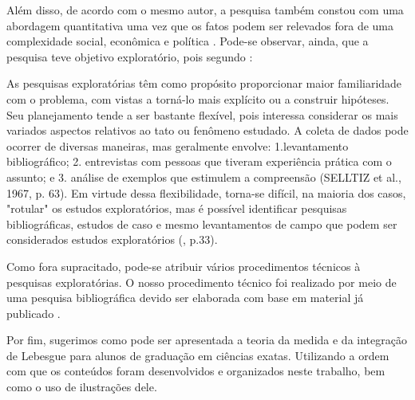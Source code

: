   	Além disso, de acordo com o mesmo autor, a pesquisa também constou com uma abordagem quantitativa uma vez que os fatos podem ser relevados fora de uma complexidade social, econômica e política \cite{profreitas}. 
  	Pode-se observar, ainda, que a pesquisa teve objetivo exploratório, pois segundo \citeauthor{gil}:
  	
  	\begin{citlon}
  		As pesquisas exploratórias têm como propósito proporcionar maior familiaridade com o problema, com vistas a torná-lo mais explícito ou a construir hipóteses. 
  		Seu planejamento tende a ser bastante flexível, pois interessa considerar os mais variados aspectos relativos ao tato ou fenômeno estudado.
  		A coleta de dados pode ocorrer de diversas maneiras, mas geralmente envolve: 1.levantamento bibliográfico;
  		2. entrevistas com pessoas que tiveram experiência prática com o assunto; 
  		e 3. análise de exemplos que estimulem a compreensão (SELLTIZ et al., 1967, p. 63). 
  		Em virtude dessa flexibilidade, torna-se difícil, na maioria dos casos, "rotular" os estudos exploratórios, mas é possível identificar pesquisas bibliográficas, estudos de caso e mesmo levantamentos de campo que podem ser considerados estudos exploratórios (\citeyear{gil}, p.33).
  	\end{citlon}
  	
  	Como fora supracitado, pode-se atribuir vários procedimentos técnicos à pesquisas exploratórias. 
  	O nosso procedimento técnico foi realizado por meio de uma pesquisa bibliográfica devido ser elaborada com base em material já publicado \cite{gil}.
  	
  	Por fim, sugerimos como pode ser apresentada a teoria da medida e da integração de Lebesgue para alunos de graduação em ciências exatas.
  	Utilizando a ordem com que os conteúdos foram desenvolvidos e organizados neste trabalho, bem como o uso de ilustrações dele.
    
    
    
    
    
    
    
    
    
    
    
    
    
    
    
    
    
    